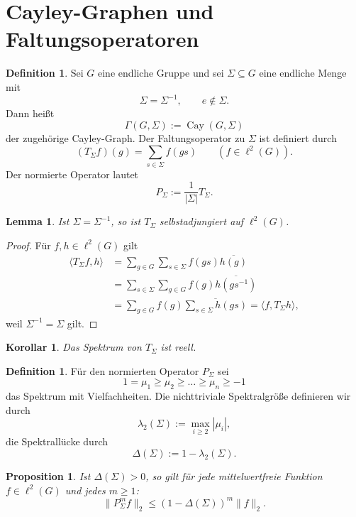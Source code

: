 \documentclass[12pt,a4paper]{article}
\theoremstyle{plain}
\newtheorem{lemma}[satz]{Lemma}
\newtheorem{korollar}[satz]{Korollar}
\newtheorem{proposition}[satz]{Proposition}
\theoremstyle{definition}
\newtheorem{definition}[satz]{Definition}
\theoremstyle{remark}
\newcommand{\Cay}{\operatorname{Cay}}
\newcommand{\ellz}{\ell^2}
\begin{document}
	\section{Cayley-Graphen und Faltungsoperatoren}
	\begin{definition}
		Sei $G$ eine endliche Gruppe und sei $\Sigma\subseteq G$ eine endliche Menge mit
		\[
		\Sigma=\Sigma^{-1}, \qquad e\notin \Sigma.
		\]
		Dann heißt
		\[
		\Gamma(G,\Sigma):=\Cay(G,\Sigma)
		\]
		der zugehörige Cayley-Graph. Der Faltungsoperator zu $\Sigma$ ist definiert durch
		\[
		(T_\Sigma f)(g)=\sum_{s\in\Sigma} f(gs)
		\qquad (f\in \ellz(G)).
		\]
		Der normierte Operator lautet
		\[
		P_\Sigma := \frac{1}{|\Sigma|}T_\Sigma.
		\]
	\end{definition}
	
	\begin{lemma}
		Ist $\Sigma=\Sigma^{-1}$, so ist $T_\Sigma$ selbstadjungiert auf $\ellz(G)$.
	\end{lemma}
	
	\begin{proof}
		Für $f,h\in \ellz(G)$ gilt
		\begin{align*}
			\langle T_\Sigma f,h\rangle
			&= \sum_{g\in G}\sum_{s\in\Sigma} f(gs)\overline{h(g)} \\
			&= \sum_{s\in\Sigma}\sum_{g\in G} f(g)\overline{h(gs^{-1})} \\
			&= \sum_{g\in G} f(g)\overline{\sum_{s\in\Sigma} h(gs)}
			= \langle f,T_\Sigma h\rangle,
		\end{align*}
		weil $\Sigma^{-1}=\Sigma$ gilt.
	\end{proof}
	
	\begin{korollar}
		Das Spektrum von $T_\Sigma$ ist reell.
	\end{korollar}
	
	\begin{definition}
		Für den normierten Operator $P_\Sigma$ sei
		\[
		1=\mu_1\ge \mu_2\ge \dots \ge \mu_n\ge -1
		\]
		das Spektrum mit Vielfachheiten. Die nichttriviale Spektralgröße definieren wir durch
		\[
		\lambda_2(\Sigma):=\max_{i\ge 2}|\mu_i|,
		\]
		die Spektrallücke durch
		\[
		\Delta(\Sigma):=1-\lambda_2(\Sigma).
		\]
	\end{definition}
	
	\begin{proposition}
		Ist $\Delta(\Sigma)>0$, so gilt für jede mittelwertfreie Funktion $f\in\ellz(G)$ und jedes $m\ge 1$:
		\[
		\|P_\Sigma^m f\|_2\le (1-\Delta(\Sigma))^m\|f\|_2.
		\]
	\end{proposition}
	
\end{document}

